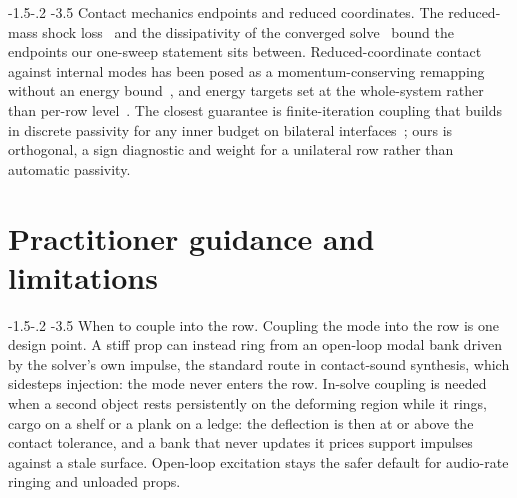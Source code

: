 \documentclass[sigconf,screen,review,anonymous]{acmart}
\makeatletter
\newcommand{\rih}{\def\@toclevel{4}%
  \@startsection{paragraph}{4}{\parindent}%
  {-1.5\p@ \@plus -1\p@ \@minus -.2\p@}%
  {-3.5\p@}%
  {\ACM@NRadjust{\@parfont\@adddotafter}}}
\theoremstyle{acmdefinition}
\makeatother
\begin{document}
\rih{Contact mechanics endpoints and reduced coordinates.} The reduced-mass
shock loss~\citep{moreau1985shocks} and the dissipativity of the converged
solve~\citep{anitescu1997lcp} bound the endpoints our one-sweep
statement sits between. Reduced-coordinate contact
against internal modes has been posed as a momentum-conserving remapping without
an energy bound~\citep{sheth2015}, and energy targets set at the whole-system
rather than per-row level~\citep{you2026energy}. The closest guarantee is
finite-iteration
coupling that builds in discrete passivity for any inner budget on bilateral
interfaces~\citep{wei2026earlyterm}; ours is orthogonal, a sign diagnostic and
weight for a unilateral row rather than automatic passivity.

\section{Practitioner guidance and limitations}
\label{sec:guidance}
\rih{When to couple into the row.} Coupling the mode into the row is one
design point. A stiff prop can instead ring from an open-loop modal bank
driven by the solver's own impulse, the standard route in
contact-sound synthesis, which sidesteps injection: the
mode never enters the row. In-solve coupling is needed when a second object rests
persistently on the deforming region while it rings, cargo on a shelf or a plank
on a ledge: the deflection is then at or above the contact tolerance, and a bank
that never updates it prices support impulses against a stale surface. Open-loop
excitation stays the safer default for audio-rate ringing and unloaded props.
\end{document}
